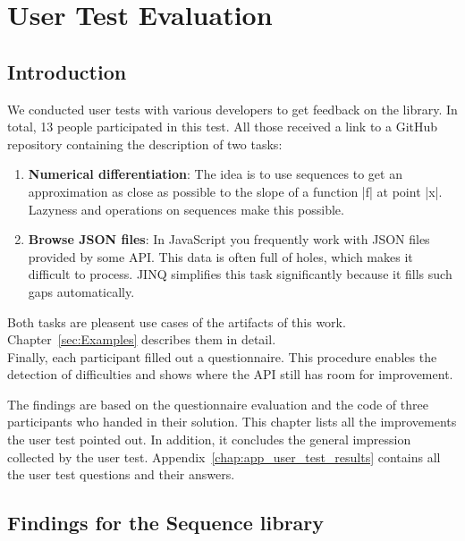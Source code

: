 \section{User Test Evaluation} %
\label{sec:User Test Evaluation}
\subsection{Introduction} %
\label{sub:Introduction}
We conducted user tests with various developers to get feedback on the library.
In total, 13 people participated in this test. All those received a link to a
GitHub repository containing the description of two tasks:
\begin{enumerate}
\item \textbf{Numerical differentiation}: The idea is to use sequences to get
  an approximation as close as possible to the slope of a function |f| at point
  |x|. Lazyness and operations on sequences make this possible.
\item \textbf{Browse JSON files}: In JavaScript you frequently work with JSON
  files provided by some API. This data is often full of holes, which makes it
  difficult to process. JINQ simplifies this task significantly because it
  fills such gaps automatically. 
\end{enumerate}
Both tasks are pleasent use cases of the artifacts of this work.
Chapter~\ref{sec:Examples} describes them in detail.\\
Finally, each participant filled out a questionnaire. This procedure enables
the detection of difficulties and shows where the API still has room for
improvement. 

The findings are based on the questionnaire evaluation and the code of three
participants who handed in their solution. This chapter lists all the
improvements the user test pointed out. In addition, it concludes the general
impression collected by the user test.
Appendix~\ref{chap:app_user_test_results} contains all the user test questions
and their answers.

\subsection{Findings for the Sequence library} %
\label{sub:Findings for the sequence library}


